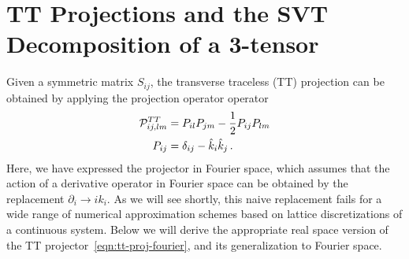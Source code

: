 \documentclass{revtex4}
\begin{document}
\section{TT Projections and the SVT Decomposition of a 3-tensor}
Given a symmetric matrix $S_{ij}$, the transverse traceless (TT) projection can be obtained by applying the projection operator operator
\begin{align}
  \label{eqn:tt-proj-fourier}
  \mathcal{P}^{TT}_{ij,lm} &= P_{il}P_{jm} - \frac{1}{2}P_{ij}P_{lm} \\
  P_{ij} &= \delta_{ij} - \hat{k}_i\hat{k}_j \, .
\end{align}
Here, we have expressed the projector in Fourier space, which assumes that the action of a derivative operator in Fourier space can be obtained by the replacement $\partial_i \to ik_i$.
As we will see shortly, this naive replacement fails for a wide range of numerical approximation schemes based on lattice discretizations of a continuous system.
Below we will derive the appropriate real space version of the TT projector~\eqref{eqn:tt-proj-fourier}, and its generalization to Fourier space.
\end{document}
